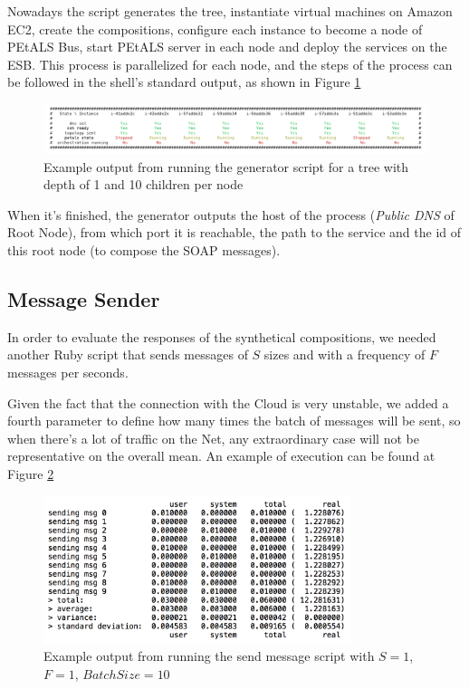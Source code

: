 Nowadays the script generates the tree, instantiate virtual machines on Amazon EC2, create the compositions, configure each instance to become a node of PEtALS Bus, start PEtALS server in each node and deploy the services on the ESB. This process is parallelized for each node, and the steps of the process can be followed in the shell's standard output, as shown in Figure \ref{generation-output}


\begin{figure}[htb]
	\centering
	\includegraphics[trim= 10mm 0mm 10mm 0mm, clip, width=\textwidth]{images/generation-output}
	\caption{Example output from running the generator script for a tree with depth of 1 and 10 children per node}
	\label{generation-output}
\end{figure}

When it's finished, the generator outputs the host of the process (\emph{Public DNS} of Root Node), from which port it is reachable, the path to the service and the id of this root node (to compose the SOAP messages).

\subsection{Message Sender}

In order to evaluate the responses of the synthetical compositions, we needed another Ruby script that sends messages of $S$ sizes and with a frequency of $F$ messages per seconds.

Given the fact that the connection with the Cloud is very unstable, we added a fourth parameter to define how many times the batch of messages will be sent, so when there's a lot of traffic on the Net, any extraordinary case will not be representative on the overall mean. An example of execution can be found at Figure \ref{send-msg-output}


\begin{figure}[htb]
	\centering
	\includegraphics[width=0.8\textwidth]{images/send-msg-output}
	\caption{Example output from running the send message script with $S = 1$, $F = 1$, $BatchSize = 10$}
	\label{send-msg-output}
\end{figure}
